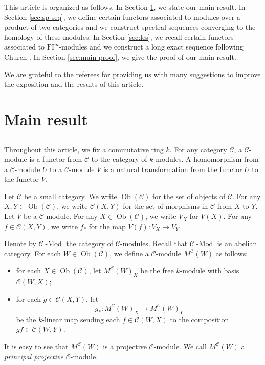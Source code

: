 \documentclass{amsart}
\numberwithin{equation}{section}
\DeclareMathOperator{\Mod}{-Mod}
\DeclareMathOperator{\Ob}{Ob}
\newcommand{\C}{{\mathscr{C}}}
\newcommand{\FI}{{\mathrm{FI}}}
\begin{document}
This article is organized as follows. In Section \ref{sec:main result}, we state our main result. In Section \ref{sec:sp seq}, we define certain functors associated to modules over a product of two categories and we construct spectral sequences converging to the homology of these modules. In Section \ref{sec:les}, we recall certain functors associated to $\FI^m$-modules and we construct a long exact sequence following Church \cite{church}. In Section \ref{sec:main proof}, we give the proof of our main result.

We are grateful to the referees for providing us with many suggestions to improve the exposition and the results of this article. 


\section{Main result} \label{sec:main result}

\subsection{}
Throughout this article, we fix a commutative ring $k$. For any category $\C$, a $\C$-module is a functor from $\C$ to the category of $k$-modules. A homomorphism from a $\C$-module $U$ to a $\C$-module $V$ is a natural transformation from the functor $U$ to the functor $V$.

Let $\C$ be a small category. We write $\Ob(\C)$ for the set of objects of $\C$. For any $X, Y\in \Ob(\C)$, we write $\C(X, Y)$ for the set of morphisms in $\C$ from $X$ to $Y$. Let $V$ be a $\C$-module. For any $X\in \Ob(\C)$, we write $V_X$ for $V(X)$. For any $f\in \C(X, Y)$, we write $f_*$ for the map $V(f): V_X\to V_Y$. 

Denote by $\C\Mod$ the category of $\C$-modules. Recall that $\C\Mod$ is an abelian category. For each $W\in \Ob(\C)$, we define a $\C$-module $M^{\C}(W)$ as follows:
\begin{itemize}
\item 
for each $X\in \Ob(\C)$, let $M^{\C}(W)_X$ be the free $k$-module with basis $\C(W, X)$; 

\item 
for each $g\in \C(X, Y)$, let 
\[ g_* : M^{\C}(W)_X \to M^{\C}(W)_Y \] 
be the $k$-linear map sending each $f\in \C(W, X)$ to the composition $gf\in \C(W, Y)$. 
\end{itemize}
It is easy to see that $M^{\C}(W)$ is a projective $\C$-module. We call $M^{\C}(W)$ a \emph{principal projective} $\C$-module. 
\end{document}
